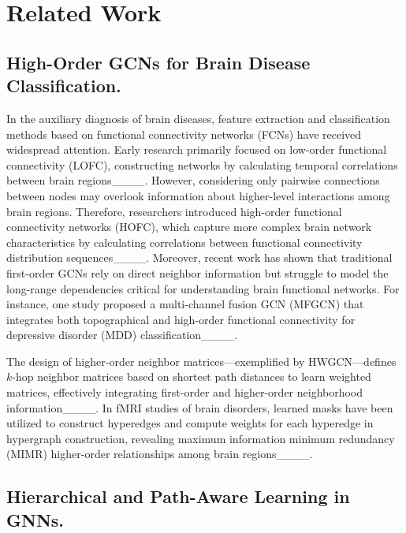 \section{Related Work}
\subsection{High-Order GCNs for Brain Disease Classification.}

In the auxiliary diagnosis of brain diseases, feature extraction and classification methods based on functional connectivity networks (FCNs) have received widespread attention. Early research primarily focused on low-order functional connectivity (LOFC), constructing networks by calculating temporal correlations between brain regions____. However, considering only pairwise connections between nodes may overlook information about higher-level interactions among brain regions. Therefore, researchers introduced high-order functional connectivity networks (HOFC), which capture more complex brain network characteristics by calculating correlations between functional connectivity distribution sequences____. Moreover, recent work has shown that traditional first-order GCNs rely on direct neighbor information but struggle to model the long-range dependencies critical for understanding brain functional networks. For instance, one study proposed a multi-channel fusion GCN (MFGCN) that integrates both topographical and high-order functional connectivity for depressive disorder (MDD) classification____. 


The design of higher-order neighbor matrices—exemplified by HWGCN—defines $k$-hop neighbor matrices based on shortest path distances to learn weighted matrices, effectively integrating first-order and higher-order neighborhood information____. In fMRI studies of brain disorders, learned masks have been utilized to construct hyperedges and compute weights for each hyperedge in hypergraph construction, revealing maximum information minimum redundancy (MIMR) higher-order relationships among brain regions____.



\vspace{-2mm}
\subsection{Hierarchical and Path-Aware Learning in GNNs.}


